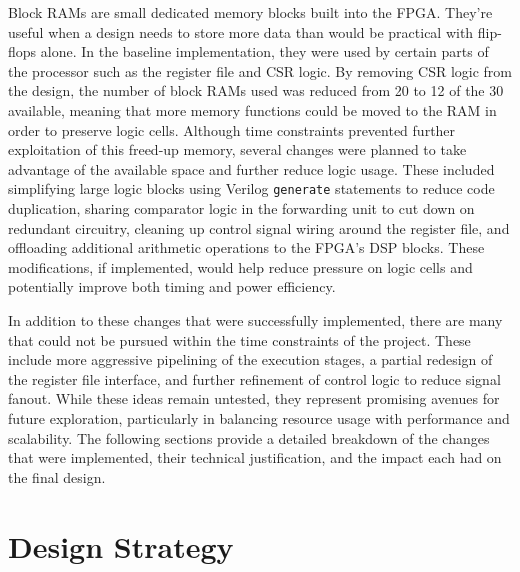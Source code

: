 \documentclass[a4paper,10pt]{article}
\begin{document}
Block RAMs are small dedicated memory blocks built into the FPGA. 
They're useful when a design needs to store more data 
than would be practical with flip-flops alone. 
In the baseline implementation, 
they were used by certain parts of the processor 
such as the register file and CSR logic. 
By removing CSR logic from the design,
the number of block RAMs used was reduced 
from 20 to 12 of the 30 available,
meaning that more memory functions could be moved to the RAM 
in order to preserve logic cells.
Although time constraints prevented further exploitation of this freed-up memory,
several changes were planned to take advantage of the available space and 
further reduce logic usage. 
These included simplifying large logic blocks 
using Verilog \texttt{generate} statements to reduce code duplication, 
sharing comparator logic in the forwarding unit to cut down on redundant circuitry, 
cleaning up control signal wiring around the register file, 
and offloading additional arithmetic operations to the FPGA's DSP blocks. 
These modifications, if implemented, would help reduce pressure on logic cells 
and potentially improve both timing and power efficiency.

In addition to these changes that were successfully implemented, 
there are many that could not be pursued within the time constraints 
of the project. These include more aggressive pipelining of the 
execution stages, a partial redesign of the register file interface, 
and further refinement of control logic to reduce signal fanout. 
While these ideas remain untested, they represent promising 
avenues for future exploration, particularly in balancing 
resource usage with performance and scalability. 
The following sections provide a detailed breakdown of 
the changes that were implemented, their technical justification, 
and the impact each had on the final design.

\newpage

\section{Design Strategy}
\label{sec:Design_Strategy}
\end{document}
